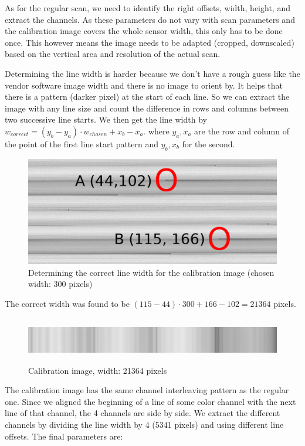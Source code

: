 \documentclass{article}
\begin{document}
As for the regular scan, we need to identify the right offsets, width, height, and
extract the channels. As these parameters do not vary with scan parameters and the
calibration image covers the whole sensor width, this only
has to be done once. This however means the image needs to be adapted (cropped, downscaled)
based on the vertical area and resolution of the actual scan.

Determining the line width is harder because we don't have a rough guess like the
vendor software image width and there is no image to orient by. It helps that there
is a pattern (darker pixel) at the start of each line. So we can extract the image
with any line size and count the difference in rows and columns between two successive
line starts. We then get the line width by $w_{correct} = (y_b - y_a) \cdot w_{chosen} + x_b - x_a$.
where $y_a, x_a$ are the row and column of the point of the first line start pattern
and $y_b, x_b$ for the second.

\begin{figure}[H]
  \centering
  \includegraphics[width=12cm]{images/extract_calib1.jpg}
  \caption{Determining the correct line width for the calibration image (chosen width: 300 pixels)}
\end{figure}

The correct width was found to be $(115 - 44) \cdot 300 + 166 - 102 = 21364$ pixels.

\begin{figure}[H]
  \centering
  \includegraphics[width=12cm, height=2cm]{images/extract_calib2.jpg}
  \caption{Calibration image, width: 21364 pixels}
\end{figure}

The calibration image has the same channel interleaving pattern as the regular one.
Since we aligned the beginning of a line of some color channel with the next line of that channel,
the 4 channels are side by side.
We extract the different channels by dividing the line width by 4 (5341 pixels)
and using different line offsets.
The final parameters are:
\end{document}
